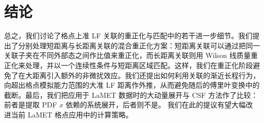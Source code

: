 \section{结论}
\label{sec:conclusion}

总之，我们讨论了格点上准 LF 关联的重正化与匹配中的若干进一步细节。我们提出了分别处理短距离与长距离关联的混合重正化方案：短距离关联可以通过把同一关联子夹在不同外部态之间作比值来重正化，而长距离关联则用 Wilson 线质量重正化来处理，并以一个连续性条件与短距离区域匹配。这样，我们在重正化阶段避免了在大距离引入额外的非微扰效应。我们还提出如何利用关联的渐近长程行为，向超出格点模拟能力范围的大准 LF 距离作外推，从而避免随后的傅里叶变换中的截断。最后，我们把应用于 LaMET 数据时的大动量展开与 CSF 方法作了比较：前者是提取 PDF $x$ 依赖的系统展开，后者则不是。
我们在此的提议有望大幅改进当前 LaMET 格点应用中的计算策略。

